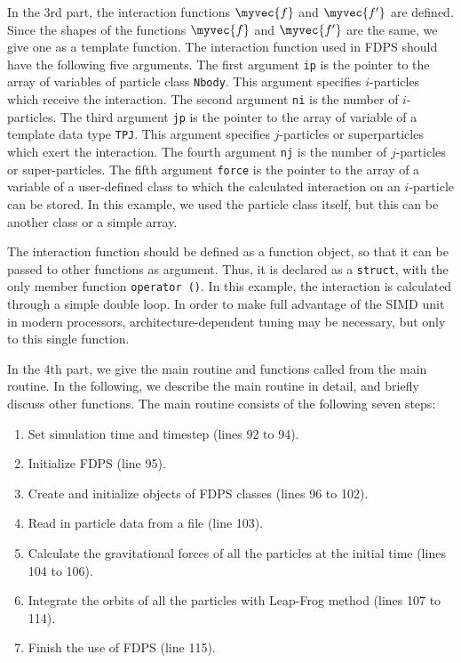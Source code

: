 In the 3rd part, the interaction functions $\myvec{f}$ and
$\myvec{f'}$ are defined. Since the shapes of the functions
$\myvec{f}$ and $\myvec{f'}$ are the same, we give one as a template
function.  The interaction function used in FDPS should have the
following five arguments. The first argument \texttt{ip} is the
pointer to the array of variables of particle
class \texttt{Nbody}. This argument specifies $i$-particles which
receive the interaction. The second argument \texttt{ni} is the number
of $i$-particles. The third argument \texttt{jp} is the pointer to the
array of variable of a template data type \texttt{TPJ}. This argument
specifies $j$-particles or superparticles which exert the
interaction. The fourth argument \texttt{nj} is the number of
$j$-particles or super-particles. The fifth argument \texttt{force} is
the pointer to the array of a variable of a user-defined class to
which the calculated interaction on an $i$-particle can be stored. In
this example, we used the particle class itself, but this can be
another class or a simple array.

%
The interaction function should be defined as a function object, so
that it can be passed to other functions as argument. Thus, it is
declared as a \texttt{struct}, with the only member
function \texttt{operator ()}.  In this example, the interaction is
calculated through a simple double loop. In order to make full
advantage of the SIMD unit in modern processors,
architecture-dependent tuning may be necessary, but only to this
single function.

In the 4th part, we give the main routine and functions called from
the main routine. In the following, we describe the main routine in
detail, and briefly discuss other functions. The main routine consists
of the following seven steps:
\begin{enumerate}
\item Set simulation time and timestep (lines 92 to 94). \label{proc:literal}
\item Initialize FDPS (line 95). \label{proc:init}
\item Create and initialize objects of FDPS classes (lines 96 to 102). \label{proc:construct}
\item Read in particle data from a file (line 103). \label{proc:input}
\item Calculate the gravitational forces of all the particles at the
  initial time (lines 104 to 106). \label{proc:calcinteraction}
\item Integrate the orbits of all the particles with Leap-Frog method
  (lines 107 to 114). \label{proc:integration}
\item Finish the use of  FDPS (line 115). \label{proc:fin}
\end{enumerate}

